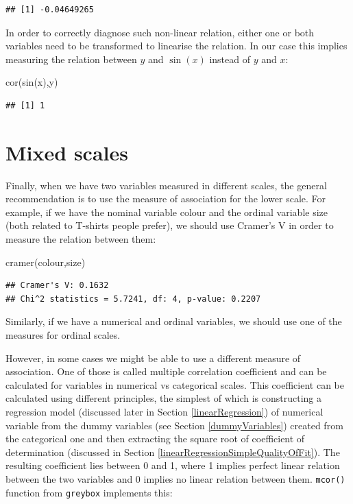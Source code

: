 \documentclass[
]{book}
\newenvironment{Shaded}{\begin{snugshade}}{\end{snugshade}}
\newcommand{\FunctionTok}[1]{\textcolor[rgb]{0.00,0.00,0.00}{#1}}
\newcommand{\NormalTok}[1]{#1}
\theoremstyle{definition}
\theoremstyle{definition}
\theoremstyle{definition}
\theoremstyle{definition}
\theoremstyle{remark}
\begin{document}
\begin{verbatim}
## [1] -0.04649265
\end{verbatim}

In order to correctly diagnose such non-linear relation, either one or both variables need to be transformed to linearise the relation. In our case this implies measuring the relation between \(y\) and \(\sin(x)\) instead of \(y\) and \(x\):

\begin{Shaded}
\begin{Highlighting}[]
\FunctionTok{cor}\NormalTok{(}\FunctionTok{sin}\NormalTok{(x),y)}
\end{Highlighting}
\end{Shaded}

\begin{verbatim}
## [1] 1
\end{verbatim}

\hypertarget{correlationsMixed}{%
\section{Mixed scales}\label{correlationsMixed}}

Finally, when we have two variables measured in different scales, the general recommendation is to use the measure of association for the lower scale. For example, if we have the nominal variable colour and the ordinal variable size (both related to T-shirts people prefer), we should use Cramer's V in order to measure the relation between them:

\begin{Shaded}
\begin{Highlighting}[]
\FunctionTok{cramer}\NormalTok{(colour,size)}
\end{Highlighting}
\end{Shaded}

\begin{verbatim}
## Cramer's V: 0.1632
## Chi^2 statistics = 5.7241, df: 4, p-value: 0.2207
\end{verbatim}

Similarly, if we have a numerical and ordinal variables, we should use one of the measures for ordinal scales.

However, in some cases we might be able to use a different measure of association. One of those is called multiple correlation coefficient and can be calculated for variables in numerical vs categorical scales. This coefficient can be calculated using different principles, the simplest of which is constructing a regression model (discussed later in Section \ref{linearRegression}) of numerical variable from the dummy variables (see Section \ref{dummyVariables}) created from the categorical one and then extracting the square root of coefficient of determination (discussed in Section \ref{linearRegressionSimpleQualityOfFit}). The resulting coefficient lies between 0 and 1, where 1 implies perfect linear relation between the two variables and 0 implies no linear relation between them. \texttt{mcor()} function from \texttt{greybox} implements this:
\end{document}
